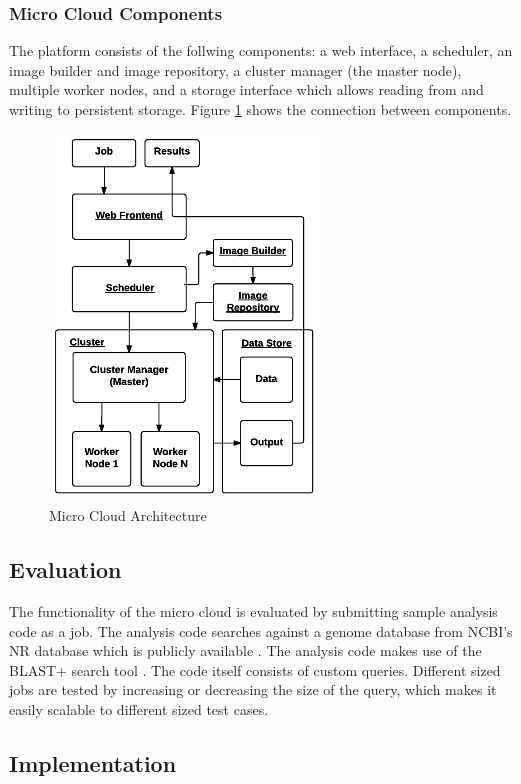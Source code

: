 \documentclass{sig-alternate-05-2015}
\begin{document}
\subsubsection{Micro Cloud Components}
The platform consists of the follwing components: a web interface, a scheduler, an image builder and image repository, a cluster manager (the master node), multiple worker nodes, and a storage interface which allows reading from and writing to persistent storage. Figure \ref{fig:architecture} shows the connection between components.

\begin{figure}
\centering
\includegraphics[scale=0.8]{img/microcloud_architecture}
\caption{Micro Cloud Architecture}
\label{fig:architecture}
\end{figure}

\subsection{Evaluation}
The functionality of the micro cloud is evaluated by submitting sample analysis code as a job. The analysis code searches against a genome database from NCBI's NR database which is publicly available \cite{pruitt2005ncbi}. The analysis code makes use of the BLAST+ search tool \cite{camacho2009blast}. The code itself consists of custom queries. Different sized jobs are tested by increasing or decreasing the size of the query, which makes it easily scalable to different sized test cases.



\subsection{Implementation}
\end{document}
